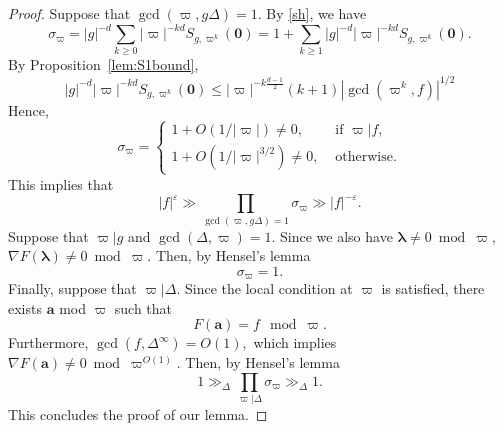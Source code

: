 \documentclass[10pt]{amsart}
\theoremstyle{plain}
\theoremstyle{plain}
\renewcommand{\vec}[1]{\mathbf{#1}}
\theoremstyle{remark}
\theoremstyle{definition}
\begin{document}
\begin{proof}
Suppose that $\gcd(\varpi,g\Delta)=1.$ By \eqref{sh}, we have 
\[
\sigma_{\varpi}=|g|^{-d}\sum_{k\geq 0}|\varpi|^{-kd}S_{g,\varpi^k}(\vec{0})=1+\sum_{k\geq 1}|g|^{-d} |\varpi|^{-kd}S_{g,\varpi^k}(\vec{0}).
\]
 By Proposition~\ref{lem:S1bound},
\[
|g|^{-d}|\varpi|^{-kd}S_{g,\varpi^k}(\vec{0})\leq |\varpi|^{-k\frac{d-1}{2}}(k+1)|\gcd(\varpi^k,f)|^{1/2}
\]
Hence,
\[
\sigma_{\varpi}=\begin{cases}1+O(1/|\varpi|)\neq 0,  &\text{ if } \varpi|f,
\\ 
1+O(1/|\varpi|^{3/2})\neq 0,  &\text{ otherwise.} 
\end{cases}
\]
This implies that 
\[
|f|^{\varepsilon}\gg \prod_{\gcd(\varpi,g\Delta)=1}\sigma_{\varpi} \gg  |f|^{-\varepsilon}.
\]
Suppose that $\varpi|g$ and  $\gcd(\Delta,\varpi)=1.$ Since we also have $\boldsymbol{\lambda}\neq 0 \bmod \varpi$, $\nabla F(\boldsymbol{\lambda}) \neq 0 \bmod \varpi.$ Then, 
by Hensel's lemma
\[
\sigma_{\varpi}=1.
\]
Finally, suppose that  $\varpi|\Delta$. Since the local condition at $\varpi$ is satisfied, there exists $\vec{a}$ mod $\varpi$ such that
\[
F(\vec{a})=f \mod \varpi.
\] 
Furthermore, $\gcd(f,\Delta^{\infty})=O(1),$ which implies   $\nabla F(\boldsymbol{\vec{a}}) \neq 0 \bmod \varpi^{O(1)}.$ Then, 
by Hensel's lemma
\[
 1 \gg_{\Delta} \prod_{\varpi|\Delta}\sigma_{\varpi}\gg_{\Delta} 1.
\]
This concludes the proof of our lemma.
\end{proof}
\end{document}
